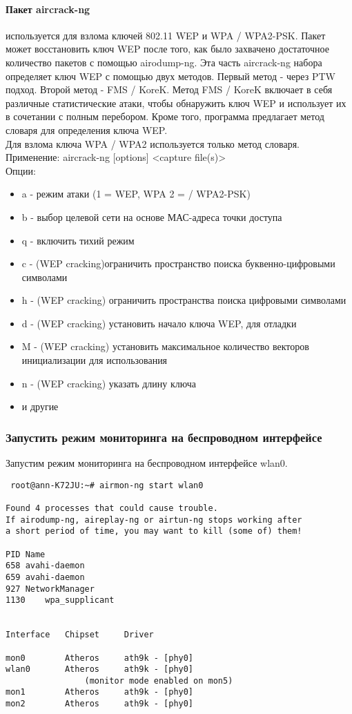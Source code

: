 \documentclass[10pt,a4paper]{report}
\begin{document}
\paragraph{Пакет aircrack-ng} используется для взлома ключей 802.11 WEP и WPA / WPA2-PSK. Пакет может восстановить ключ WEP после того, как было захвачено достаточное количество пакетов с помощью  airodump-ng. 
Эта часть aircrack-ng набора определяет ключ WEP с помощью двух методов. Первый метод - через PTW подход. Второй метод -  FMS / KoreK. Метод FMS / KoreK включает в себя различные статистические атаки, чтобы обнаружить ключ WEP и использует их в сочетании с полным перебором. Кроме того, программа предлагает метод словаря для определения ключа WEP. \\
Для взлома ключа WPA / WPA2 используется только метод словаря.  \\
Применение:  aircrack-ng [options] <capture file(s)> \\
Опции: \\
\begin{itemize}
\item a - режим атаки (1 =  WEP, WPA 2 = / WPA2-PSK)
\item b	- выбор целевой сети на основе МАС-адреса точки доступа
\item q	- включить тихий режим
\item c	- (WEP cracking)ограничить пространство поиска буквенно-цифровыми символами
\item h	- (WEP cracking) ограничить пространства поиска цифровыми символами
\item d	- (WEP cracking) установить начало ключа WEP, для отладки
\item M	- (WEP cracking) установить максимальное количество векторов инициализации для использования 
\item n	- (WEP cracking) указать длину ключа
\item и другие
\end{itemize}
\subsubsection{Запустить режим мониторинга на беспроводном интерфейсе}
Запустим режим мониторинга на беспроводном интерфейсе wlan0.
\begin{verbatim}
 root@ann-K72JU:~# airmon-ng start wlan0

Found 4 processes that could cause trouble.
If airodump-ng, aireplay-ng or airtun-ng stops working after
a short period of time, you may want to kill (some of) them!

PID	Name
658	avahi-daemon
659	avahi-daemon
927	NetworkManager
1130	wpa_supplicant


Interface	Chipset		Driver

mon0		Atheros 	ath9k - [phy0]
wlan0		Atheros 	ath9k - [phy0]
				(monitor mode enabled on mon5)
mon1		Atheros 	ath9k - [phy0]
mon2		Atheros 	ath9k - [phy0]
\end{verbatim}
\end{document}
